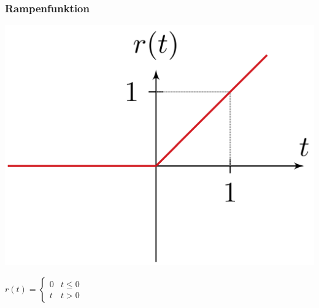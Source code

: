 		\subsubsection{Rampenfunktion}
			\begin{minipage}{0.2\textwidth}
				\includegraphics[width=\textwidth]{./bilder/funktionen/rampenF.png}
			\end{minipage}
			\qquad
			\begin{minipage}{0.45\textwidth}
				$r(t)=\begin{cases}
				{0} & {t \leq 0} \\ 
				{t} & {t>0}
				\end{cases}$
			\end{minipage}
			\qquad
			\begin{minipage}{0.25\textwidth}						
			\end{minipage}		
		
